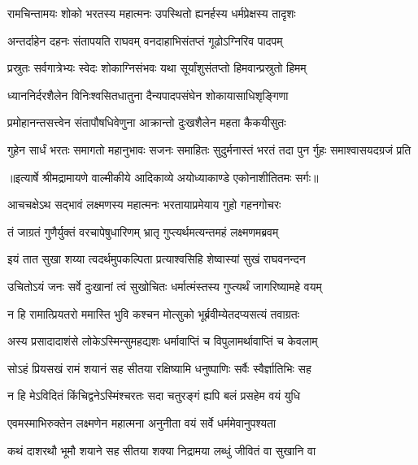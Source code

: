 \twolineshloka
{रामचिन्तामयः शोको भरतस्य महात्मनः}
{उपस्थितो ह्यनर्हस्य धर्मप्रेक्षस्य तादृशः} %

\twolineshloka
{अन्तर्दाहेन दहनः संतापयति राघवम्}
{वनदाहाभिसंतप्तं गूढोऽग्निरिव पादपम्} %

\twolineshloka
{प्रस्रुतः सर्वगात्रेभ्यः स्वेदः शोकाग्निसंभवः}
{यथा सूर्यांशुसंतप्तो हिमवान्प्रस्रुतो हिमम्} %

\twolineshloka
{ध्याननिर्दरशैलेन विनिःश्वसितधातुना}
{दैन्यपादपसंघेन शोकायासाधिशृङ्गिणा} %

\twolineshloka
{प्रमोहानन्तसत्त्वेन संतापौषधिवेणुना}
{आक्रान्तो दुःखशैलेन महता कैकयीसुतः} %

\fourlineindentedshloka
{गुहेन सार्धं भरतः समागतो}
{ महानुभावः सजनः समाहितः}
{सुदुर्मनास्तं भरतं तदा पुन}
{र्गुहः समाश्वासयदग्रजं प्रति} %


{॥इत्यार्षे श्रीमद्रामायणे वाल्मीकीये आदिकाव्ये अयोध्याकाण्डे एकोनाशीतितमः सर्गः॥}


\twolineshloka
{आचचक्षेऽथ सद्भावं लक्ष्मणस्य महात्मनः}
{भरतायाप्रमेयाय गुहो गहनगोचरः} %

\twolineshloka
{तं जाग्रतं गुणैर्युक्तं वरचापेषुधारिणम्}
{भ्रातृ गुप्त्यर्थमत्यन्तमहं लक्ष्मणमब्रवम्} %

\twolineshloka
{इयं तात सुखा शय्या त्वदर्थमुपकल्पिता}
{प्रत्याश्वसिहि शेष्वास्यां सुखं राघवनन्दन} %

\twolineshloka
{उचितोऽयं जनः सर्वे दुःखानां त्वं सुखोचितः}
{धर्मात्मंस्तस्य गुप्त्यर्थं जागरिष्यामहे वयम्} %

\twolineshloka
{न हि रामात्प्रियतरो ममास्ति भुवि कश्चन}
{मोत्सुको भूर्ब्रवीम्येतदप्यसत्यं तवाग्रतः} %

\twolineshloka
{अस्य प्रसादादाशंसे लोकेऽस्मिन्सुमहद्यशः}
{धर्मावाप्तिं च विपुलामर्थावाप्तिं च केवलाम्} %

\twolineshloka
{सोऽहं प्रियसखं रामं शयानं सह सीतया}
{रक्षिष्यामि धनुष्पाणिः सर्वैः स्वैर्ज्ञातिभिः सह} %

\twolineshloka
{न हि मेऽविदितं किंचिद्वनेऽस्मिंश्चरतः सदा}
{चतुरङ्गं ह्यपि बलं प्रसहेम वयं युधि} %

\twolineshloka
{एवमस्माभिरुक्तेन लक्ष्मणेन महात्मना}
{अनुनीता वयं सर्वे धर्ममेवानुपश्यता} %

\twolineshloka
{कथं दाशरथौ भूमौ शयाने सह सीतया}
{शक्या निद्रामया लब्धुं जीवितं वा सुखानि वा} %

